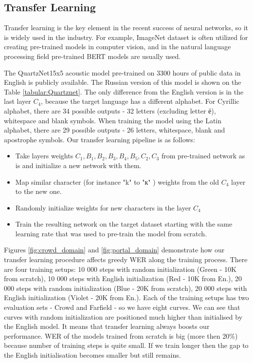 \documentclass[a4paper]{article}
\begin{document}
\subsection{Transfer Learning}

Transfer learning is the key element in the recent success of neural networks, so it is widely used in the industry. For example, ImageNet dataset is often utilized for creating pre-trained models in computer vision, and in the natural language processing field pre-trained BERT models are usually used. 

The QuartzNet15x5 acoustic model pre-trained on 3300 hours of public data in English is publicly available. The Russian version of this model is shown on the Table \ref{tabular:Quartznet}. The only difference from the English version is in the last layer $C_4$, because the target language has a different alphabet. For Cyrillic alphabet, there are 34 possible outputs - 32 letters (excluding letter ё), whitespace and blank symbols. When training the model using the Latin alphabet, there are 29 possible outputs - 26 letters, whitespace, blank and apostrophe symbols. Our transfer learning pipeline is as follows:
\begin{itemize}
    \item Take layers weights $C_1, B_1, B_2, B_3, B_4, B_5, C_2, C_3$ from pre-trained network as is and initialize a new network with them.
    \item Map similar character (for instance "k"  to "к" ) weights from the old $C_4$ layer to the new one.
    \item Randomly initialize weights for new characters in the layer $C_4$
    \item Train the resulting network on the target dataset starting with the same learning rate that was used to pre-train the model from scratch.
\end{itemize}

Figures \ref{fig:crowd_domain} and \ref{fig:portal_domain} demonstrate how our transfer learning procedure affects greedy WER along the training process. There are four training setups: 10 000 steps with random initialization (Green - 10K from scratch), 10 000 steps with English initialization (Red - 10K from En.), 20 000 steps with random initialization (Blue - 20K from scratch), 20 000 steps with English initialization (Violet - 20K from En.). Each of the training setups has two evaluation sets - Crowd and Farfield - so we have eight curves. We can see that curves with random initialization are positioned much higher than initialised by the English model. It means that transfer learning always boosts our performance. WER of the models trained from scratch is big (more then 20\%) because number of training steps is quite small. If we train longer then the gap to the English initialisation becomes smaller but still remains.
\end{document}
